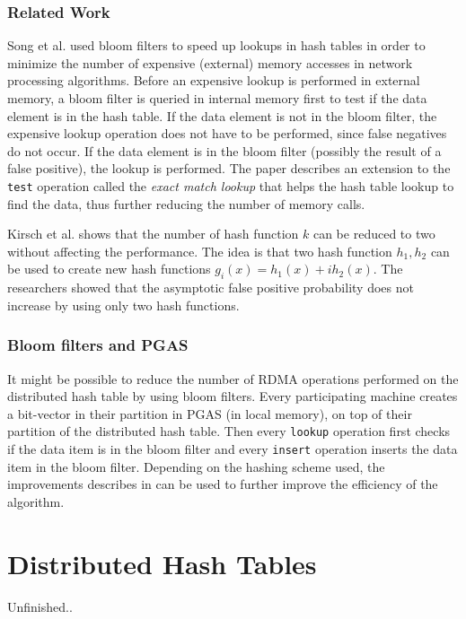 \subsubsection{Related Work}
Song et al. \cite{song2005fast} used bloom filters to speed up lookups in hash tables in order to minimize the number of expensive (external) memory accesses in network processing algorithms. Before an expensive lookup is performed in external memory, a bloom filter is queried in internal memory first to test if the data element is in the hash table. If the data element is not in the bloom filter, the expensive lookup operation does not have to be performed, since false negatives do not occur. If the data element is in the bloom filter (possibly the result of a false positive), the lookup is performed. The paper describes an extension to the \texttt{test} operation called the \emph{exact match lookup} that helps the hash table lookup to find the data, thus further reducing the number of memory calls. 

Kirsch et al. \cite{kirsch2006less} shows that the number of hash function $k$ can be reduced to two without affecting the performance. The idea is that two hash function $h_1, h_2$ can be used to create new hash functions $g_i(x) = h_1(x) + ih_2(x)$. The researchers showed that the asymptotic false positive probability does not increase by using only two hash functions.

\subsubsection{Bloom filters and PGAS}
It might be possible to reduce the number of RDMA operations performed on the distributed hash table by using bloom filters. Every participating machine creates a bit-vector in their partition in PGAS (in local memory), on top of their partition of the distributed hash table. Then every \texttt{lookup} operation first checks if the data item is in the bloom filter and every \texttt{insert} operation inserts the data item in the bloom filter. Depending on the hashing scheme used, the improvements describes in \cite{song2005fast, kirsch2006less} can be used to further improve the efficiency of the algorithm.

\section{Distributed Hash Tables}
Unfinished..